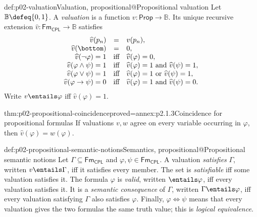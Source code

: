 \begin{hbdefinition}{def:p02-valuation}{Valuation, propositional@Propositional valuation}
Let \(\mathbb B\defeq\{0,1\}\).  A \emph{valuation} is a
function \(v:\mathsf{Prop}\to\mathbb B\).  Its unique recursive extension
\(\widehat v:\mathsf{Fm}_{\mathsf{CPL}}\to\mathbb B\) satisfies
\[
\begin{array}{rcl}
\widehat v(p_n)&=&v(p_n),\\
\widehat v(\bottom)&=&0,\\
\widehat v(\neg\varphi)=1&\text{iff}&\widehat v(\varphi)=0,\\
\widehat v(\varphi\land\psi)=1&\text{iff}&
 \widehat v(\varphi)=1\text{ and }\widehat v(\psi)=1,\\
\widehat v(\varphi\lor\psi)=1&\text{iff}&
 \widehat v(\varphi)=1\text{ or }\widehat v(\psi)=1,\\
\widehat v(\varphi\to\psi)=0&\text{iff}&
 \widehat v(\varphi)=1\text{ and }\widehat v(\psi)=0.
\end{array}
\]
Write \(v\entails\varphi\) iff \(\widehat v(\varphi)=1\).
\end{hbdefinition}

\begin{hblemma}{thm:p02-propositional-coincidence}{proved=annex:p2.1.3}{Coincidence for propositional formulas}
If valuations \(v,w\) agree on every variable occurring in \(\varphi\),
then \(\widehat v(\varphi)=\widehat w(\varphi)\).
\end{hblemma}

\begin{hbdefinition}{def:p02-propositional-semantic-notions}{Semantics, propositional@Propositional semantic notions}
Let \(\Gamma\subseteq\mathsf{Fm}_{\mathsf{CPL}}\) and
\(\varphi,\psi\in\mathsf{Fm}_{\mathsf{CPL}}\).  A valuation \emph{satisfies}
\(\Gamma\), written \(v\entails\Gamma\), iff it satisfies every member.
The set is \emph{satisfiable} iff some valuation satisfies it.  The formula
\(\varphi\) is \emph{valid}, written \(\entails\varphi\), iff every valuation
satisfies it.  It is a \emph{semantic consequence} of \(\Gamma\), written
\(\Gamma\entails\varphi\), iff every valuation satisfying \(\Gamma\) also
satisfies \(\varphi\).  Finally,
\(\varphi\Leftrightarrow\psi\) means that every valuation gives the two
formulas the same truth value; this is \emph{logical equivalence}.
\end{hbdefinition}

